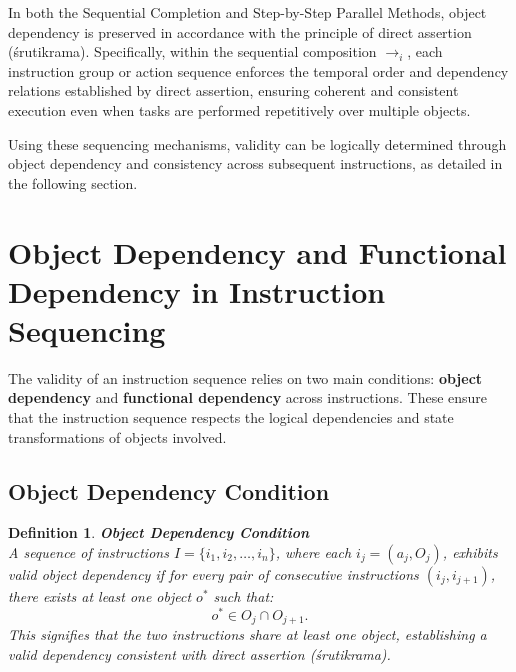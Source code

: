 \documentclass[a4paper,11pt]{lmcs}
\newtheorem{definition}{Definition}%
\begin{document}
In both the Sequential Completion and Step-by-Step Parallel Methods, object dependency is preserved in accordance with the principle of direct assertion (śrutikrama). Specifically, within the sequential composition $\rightarrow_i$, each instruction group or action sequence enforces the temporal order and dependency relations established by direct assertion, ensuring coherent and consistent execution even when tasks are performed repetitively over multiple objects.

Using these sequencing mechanisms, validity can be logically determined through object dependency and consistency across subsequent instructions, as detailed in the following section.
\section{Object Dependency and Functional Dependency in Instruction Sequencing}

The validity of an instruction sequence relies on two main conditions: \textbf{object dependency} and \textbf{functional dependency} across instructions. These ensure that the instruction sequence respects the logical dependencies and state transformations of objects involved.

\subsection{Object Dependency Condition}
\begin{definition}
\textbf{Object Dependency Condition} \\
A sequence of instructions \( I = \{i_1, i_2, \ldots, i_n\} \), where each \( i_j = (a_j, O_j) \), exhibits valid object dependency if for every pair of consecutive instructions \( (i_j, i_{j+1}) \), there exists at least one object \( o^* \) such that:
\[
o^* \in O_j \cap O_{j+1}.
\]
This signifies that the two instructions share at least one object, establishing a valid dependency consistent with direct assertion (śrutikrama).
\end{definition}
\end{document}
